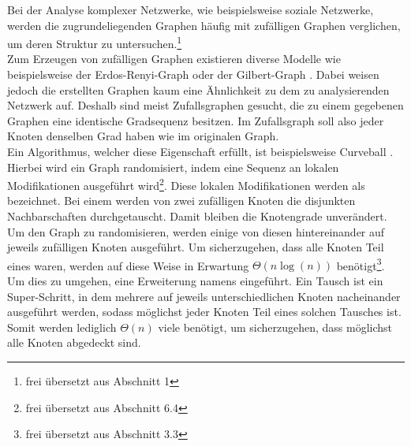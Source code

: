 \glqq Bei der Analyse komplexer Netzwerke, wie beispielsweise soziale Netzwerke, 
werden die zugrundeliegenden Graphen häufig mit zufälligen Graphen verglichen, 
um deren Struktur zu untersuchen.\grqq\footnote{frei übersetzt aus \cite{DBLP:conf/esa/CarstensH0PTW18} Abschnitt 1}
\\

Zum Erzeugen von zufälligen Graphen existieren diverse Modelle wie beispielsweise der Erdos-Renyi-Graph \cite{erdos}
oder der Gilbert-Graph \cite{gilbert}.
Dabei weisen jedoch die erstellten Graphen kaum eine Ähnlichkeit zu dem zu analysierenden Netzwerk auf.
Deshalb sind meist Zufallsgraphen gesucht, die zu einem gegebenen Graphen eine identische Gradsequenz
besitzen. Im Zufallsgraph soll also jeder Knoten denselben Grad haben wie im originalen Graph.
\\

Ein Algorithmus, welcher diese Eigenschaft erfüllt, ist beispielsweise Curveball \cite{curveball}.
Hierbei wird ein Graph \glqq randomisiert, indem eine Sequenz an lokalen Modifikationen ausgeführt wird\grqq\footnote{\label{ftn:survey}frei übersetzt aus \cite{penschuck2020recent} Abschnitt 6.4}.
Diese lokalen Modifikationen werden als \ct{} bezeichnet. Bei einem \ct{} werden von zwei zufälligen 
Knoten die disjunkten Nachbarschaften durchgetauscht. Damit bleiben die Knotengrade unverändert.
Um den Graph zu randomisieren, werden einige von diesen  hintereinander auf jeweils zufälligen Knoten ausgeführt.
Um sicherzugehen, dass alle Knoten Teil eines  waren, werden auf diese Weise
\glqq in Erwartung $\Theta(n\log(n))$   benötigt\grqq \footnote{frei übersetzt aus \cite{DBLP:conf/esa/CarstensH0PTW18} Abschnitt 3.3}.
Um dies zu umgehen,  eine Erweiterung namens \gc{} \cite{DBLP:conf/esa/CarstensH0PTW18} eingeführt. 
Ein \gc{} Tausch ist ein \glqq Super-Schritt\grqq {}, in dem mehrere  auf jeweils
unterschiedlichen Knoten nacheinander ausgeführt werden, sodass möglichst jeder Knoten Teil eines solchen Tausches ist. 
Somit werden lediglich $\Theta(n)$ viele  benötigt, um sicherzugehen, 
dass möglichst alle Knoten abgedeckt sind.
\\

